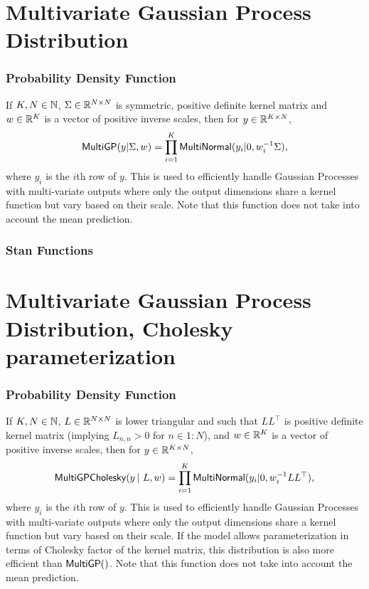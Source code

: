 \section{Multivariate Gaussian Process Distribution}

\subsubsection{Probability Density Function}

If $K,N \in \mathbb{N}$, $\Sigma \in \mathbb{R}^{N \times N}$ is symmetric,
positive definite kernel matrix and $w \in \mathbb{R}^{K}$ is a vector of positive
inverse scales, then for $y \in \mathbb{R}^{K \times N}$,
\[
\mbox{\sf MultiGP}(y|\Sigma,w)
=
\prod_{i=1}^{K} \mbox{\sf MultiNormal}(y_i|0,w_i^{-1} \Sigma),
\]
where $y_i$ is the $i$th row of $y$.  This is used to efficiently handle
Gaussian Processes with multi-variate outputs where only the output dimensions
share a kernel function but vary based on their scale.  Note that this
function does not take into account the mean prediction.


\subsubsection{Stan Functions}

\begin{description}
%
%
\end{description}


\section{Multivariate Gaussian Process Distribution, Cholesky parameterization}

\subsubsection{Probability Density Function}

If $K,N \in \mathbb{N}$, $L \in \mathbb{R}^{N \times N}$ is lower triangular
and such that $LL^{\top}$ is positive definite kernel matrix (implying
$L_{n,n} > 0$ for $n \in 1{:}N$), and $w \in \mathbb{R}^{K}$ is a vector
of positive inverse scales, then for $y \in \mathbb{R}^{K \times N}$,
\[
\mbox{\sf MultiGPCholesky}(y \, | \ L,w)
=
\prod_{i=1}^{K} \mbox{\sf MultiNormal}(y_i|0,w_i^{-1} LL^{\top}),
\]
where $y_i$ is the $i$th row of $y$.  This is used to efficiently handle
Gaussian Processes with multi-variate outputs where only the output dimensions
share a kernel function but vary based on their scale.  If the model allows
parameterization in terms of Cholesky factor of the kernel matrix, this distribution
is also more efficient than $\mbox{\sf MultiGP}()$. Note that this
function does not take into account the mean prediction.

